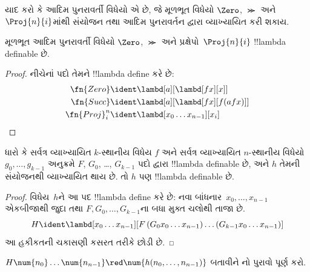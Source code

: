\documentclass[../../../include/open-logic-section]{subfiles}
\begin{document}

યાદ કરો કે આદિમ પુનરાવર્તી વિધેયો એ છે, જે મૂળભૂત
વિધેયો $\Zero$, $\Succ$ અને $\Proj{n}{i}$માંથી
સંયોજન તથા આદિમ પુનરાવર્તન દ્વારા વ્યાખ્યાયિત કરી શકાય.

\begin{lem}
  મૂળભૂત આદિમ પુનરાવર્તી વિધેયો $\Zero$, $\Succ$ અને
  પ્રક્ષેપો~$\Proj{n}{i}$ !!{lambda definable} છે.
\end{lem}

\begin{proof}
નીચેનાં પદો તેમને !!{lambda define} કરે છે:
\begin{align*}
  \fn{Zero} & \ident \lambd[a][\lambd[fx][x]]\\
  \fn{Succ} & \ident \lambd[a][\lambd[fx][f (a f x)]] \\
  \fn{Proj}^n_i & \ident \lambd[x_0\dots x_{n-1}][x_i]
\end{align*}
\end{proof}

\begin{lem}
   ધારો કે સર્વત્ર વ્યાખ્યાયિત
  $k$-સ્થાનીય વિધેય $f$ અને
  સર્વત્ર વ્યાખ્યાયિત $n$-સ્થાનીય વિધેયો $g_0, \dots, g_{k-1}$ અનુક્રમે
  $F$, $G_0$, \dots, $G_{k-1}$ પદો દ્વારા
  !!{lambda definable} છે, અને $h$ તેમની
  સંયોજનથી વ્યાખ્યાયિત થાય છે. તો $h$ પણ
  !!{lambda definable} છે.
\end{lem}

\begin{proof}
  વિધેય~$h$ને આ પદ !!{lambda define} કરે છે:
  નવા બાંધનાર~$x_0,\ldots,x_{n-1}$ એકબીજાથી જુદા તથા
  $F,G_0,\ldots,G_{k-1}$ના બધા મુક્ત ચલોથી તાજા છે.
  \[
  H \ident \lambd[x_0 \dots x_{n-1}][F\, (G_0 x_0 \dots
    x_{n-1}) \dots (G_{k-1} x_0 \dots x_{n-1})]
  \]
  આ હકીકતની ચકાસણી કસરત તરીકે છોડી છે.
\end{proof}

\begin{prob}
  $H\num{n_0}\dots\num{n_{n-1}} \red \num{h(n_0, \dots,
    n_{n-1})}$ બતાવીને
  નો પુરાવો પૂર્ણ કરો.
\end{prob}
\end{document}
